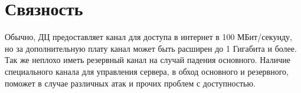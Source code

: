 
\section{ Связность } \label{sect2_17}

Обычно, ДЦ предоставляет канал для доступа в интернет в 100 МБит/секунду, но за дополнительную плату канал может быть расширен до 1 Гигабита и более. Так же неплохо иметь резервный канал на случай падения основного. Наличие специального канала для управления сервера, в обход основного и резервного, поможет в случае различных атак и прочих проблем с доступностью.






























\clearpage


